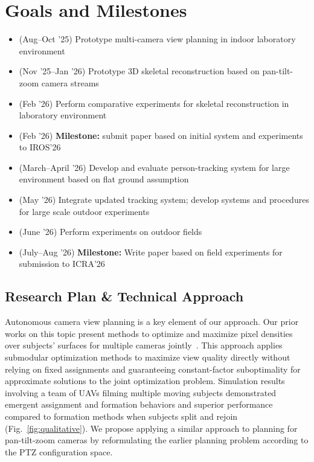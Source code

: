 \documentclass[11pt]{article}
\begin{document}
\section{Goals and Milestones}

\begin{itemize}
  \item (Aug--Oct '25) Prototype multi-camera view planning in indoor
    laboratory environment
  \item (Nov '25--Jan '26) Prototype 3D skeletal reconstruction based on
    pan-tilt-zoom camera streams
  \item (Feb '26) Perform comparative experiments for skeletal reconstruction in
    laboratory environment
  \item (Feb '26) \textbf{Milestone:} submit paper based on initial system and
    experiments to IROS'26
  \item (March--April '26) Develop and evaluate person-tracking system for large
    environment based on flat ground assumption
  \item (May '26) Integrate updated tracking system; develop systems and
    procedures for large scale outdoor experiments
  \item (June '26) Perform experiments on outdoor fields
  \item (July--Aug '26) \textbf{Milestone:}
    Write paper based on field experiments for submission to ICRA'26
\end{itemize}


\subsection{Research Plan \& Technical Approach}

Autonomous camera view planning is a key element of our approach.
Our prior works on this topic present methods to optimize and maximize pixel
densities over subjects' surfaces for multiple cameras
jointly~\citep{suresh2024iros,hughes2024cdc}.
This approach applies submodular optimization methods to maximize view quality
directly without relying on fixed assignments and guaranteeing constant-factor
suboptimality for approximate solutions to the joint optimization problem.
Simulation results involving a team of UAVs filming multiple moving subjects
demonstrated emergent assignment and formation behaviors and superior
performance compared to formation methods when subjects split and rejoin
(Fig.~\ref{fig:qualitative}).
We propose applying a similar approach to planning for pan-tilt-zoom cameras by
reformulating the earlier planning problem according to the PTZ configuration
space.
\end{document}
